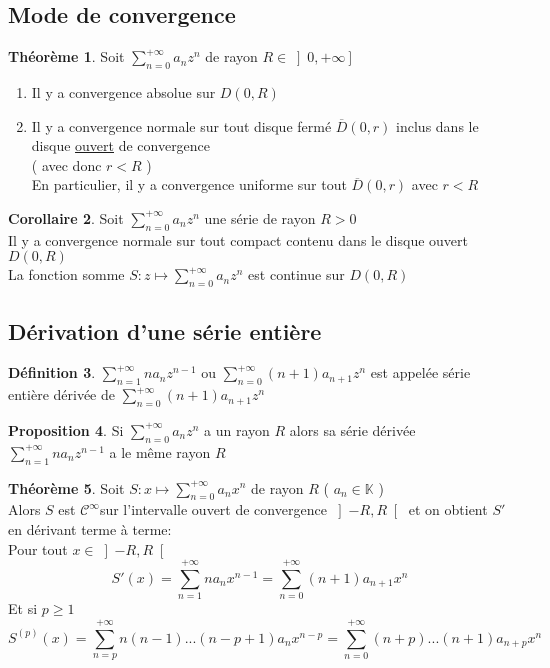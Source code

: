 \documentclass[10pt,a4paper]{article}
\theoremstyle{definition}
\newtheorem{proposition}{Proposition}[section]
\newtheorem{theorem}[proposition]{Théorème}
\newtheorem{corollary}[proposition]{Corollaire}
\newtheorem{definition}[proposition]{Définition}
\begin{document}
\subsection{Mode de convergence}
\begin{theorem}
    Soit \(\sum\limits_{n = 0}^{+\infty} a_n z^n\) de rayon \(R \in \left]0, +\infty \right]\)
    \begin{enumerate}
        \item Il y a convergence absolue sur \(D(0, R)\)
        \item Il y a convergence normale sur tout disque fermé \(\overline{D}(0, r)\) inclus dans le disque \uline{ouvert} de convergence \\
        ( avec donc \(r < R\) ) \\
        En particulier, il y a convergence uniforme sur tout \(\overline{D}(0, r)\) avec \(r < R\)
    \end{enumerate}
\end{theorem}
\begin{corollary}
    Soit \(\sum\limits_{n = 0}^{+\infty} a_n z^n\) une série de rayon \(R > 0\) \\
    Il y a convergence normale sur tout compact contenu dans le disque ouvert \(D(0, R)\) \\
    La fonction somme \(S: z \mapsto \sum\limits_{n = 0}^{+\infty} a_n z^n\) est continue sur \(D(0, R)\)
\end{corollary}

\subsection{Dérivation d'une série entière}
\begin{definition}
    \(\sum\limits_{n = 1}^{+\infty} n a_n z^{n - 1}\) ou \(\sum\limits_{n = 0}^{+\infty} (n + 1) a_{n + 1} z^n\) est appelée série entière dérivée de \(\sum\limits_{n = 0}^{+\infty} (n + 1) a_{n + 1} z^n\)
\end{definition}
\begin{proposition}
    Si \(\sum\limits_{n = 0}^{+\infty} a_n z^n\) a un rayon \(R\) alors sa série dérivée \(\sum\limits_{n = 1}^{+\infty} n a_n z^{n - 1}\) a le même rayon \(R\)
\end{proposition}
\begin{theorem}
    Soit \(S: x \mapsto \sum\limits_{n = 0}^{+\infty} a_n x^n\) de rayon \(R\) ( \(a_n \in \mathbb{K}\) ) \\
    Alors \(S\) est \(\mathcal{C}^{\infty}\)sur l'intervalle ouvert de convergence \(\left] -R, R \right[\) et on obtient \(S'\) en dérivant terme à terme: \\
    Pour tout \(x \in \left] -R, R \right[\)
    \[\boxed{S'(x) = \sum_{n = 1}^{+\infty} n a_n x^{n - 1} = \sum_{n = 0}^{+\infty} (n + 1) a_{n + 1} x^n}\]
    Et si \(p \geq 1\)
    \[\boxed{S^{(p)}(x) = \sum_{n = p}^{+\infty} n(n - 1) ... (n - p + 1) a_n x^{n - p} = \sum_{n = 0}^{+\infty} (n + p) ... (n + 1) a_{n + p} x^n}\]
\end{theorem}
\end{document}
